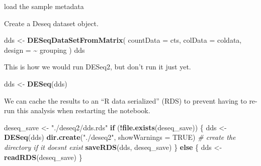 \documentclass[
]{book}
\newenvironment{Shaded}{\begin{snugshade}}{\end{snugshade}}
\newcommand{\AttributeTok}[1]{\textcolor[rgb]{0.13,0.29,0.53}{#1}}
\newcommand{\CommentTok}[1]{\textcolor[rgb]{0.56,0.35,0.01}{\textit{#1}}}
\newcommand{\ConstantTok}[1]{\textcolor[rgb]{0.56,0.35,0.01}{#1}}
\newcommand{\ControlFlowTok}[1]{\textcolor[rgb]{0.13,0.29,0.53}{\textbf{#1}}}
\newcommand{\FunctionTok}[1]{\textcolor[rgb]{0.13,0.29,0.53}{\textbf{#1}}}
\newcommand{\NormalTok}[1]{#1}
\newcommand{\OtherTok}[1]{\textcolor[rgb]{0.56,0.35,0.01}{#1}}
\newcommand{\SpecialCharTok}[1]{\textcolor[rgb]{0.81,0.36,0.00}{\textbf{#1}}}
\newcommand{\StringTok}[1]{\textcolor[rgb]{0.31,0.60,0.02}{#1}}
\begin{document}
load the sample metadata

\begin{Shaded}
\end{Shaded}

Create a Deseq dataset object.

\begin{Shaded}
\begin{Highlighting}[numbers=left,,]
\NormalTok{dds }\OtherTok{\textless{}{-}} \FunctionTok{DESeqDataSetFromMatrix}\NormalTok{(}
  \AttributeTok{countData =}\NormalTok{ cts,}
  \AttributeTok{colData =}\NormalTok{ coldata,}
  \AttributeTok{design =} \SpecialCharTok{\textasciitilde{}}\NormalTok{ grouping}
\NormalTok{)}
\NormalTok{dds}
\end{Highlighting}
\end{Shaded}

This is how we would run DESeq2, but don't run it just yet.

\begin{Shaded}
\begin{Highlighting}[numbers=left,,]
\NormalTok{dds }\OtherTok{\textless{}{-}} \FunctionTok{DESeq}\NormalTok{(dds)}
\end{Highlighting}
\end{Shaded}

We can cache the results to an ``R data serialized'' (RDS) to prevent having to re-run this analysis when restarting the notebook.

\begin{Shaded}
\begin{Highlighting}[numbers=left,,]
\NormalTok{deseq\_save }\OtherTok{\textless{}{-}} \StringTok{"./deseq2/dds.rds"}
\ControlFlowTok{if}\NormalTok{ (}\SpecialCharTok{!}\FunctionTok{file.exists}\NormalTok{(deseq\_save)) \{}
\NormalTok{  dds }\OtherTok{\textless{}{-}} \FunctionTok{DESeq}\NormalTok{(dds)}
  \FunctionTok{dir.create}\NormalTok{(}\StringTok{"./deseq2"}\NormalTok{, }\AttributeTok{showWarnings =} \ConstantTok{TRUE}\NormalTok{) }\CommentTok{\# create the directory if it doesn\textquotesingle{}t exist}
  \FunctionTok{saveRDS}\NormalTok{(dds, deseq\_save)}
\NormalTok{\} }\ControlFlowTok{else}\NormalTok{ \{}
\NormalTok{  dds }\OtherTok{\textless{}{-}} \FunctionTok{readRDS}\NormalTok{(deseq\_save)}
\NormalTok{\}}
\end{Highlighting}
\end{Shaded}
\end{document}

